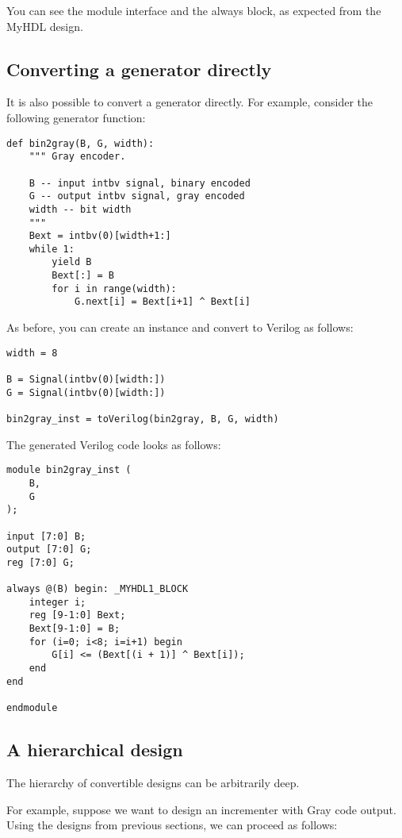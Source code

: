 You can see the module interface and the always block, as expected
from the MyHDL design. 

\subsection{Converting a generator directly\label{conv-usage-gen}}

It is also possible to convert a generator
directly. For example, consider the following generator function:

\begin{verbatim}
def bin2gray(B, G, width):
    """ Gray encoder.

    B -- input intbv signal, binary encoded
    G -- output intbv signal, gray encoded
    width -- bit width
    """
    Bext = intbv(0)[width+1:]
    while 1:
        yield B
        Bext[:] = B
        for i in range(width):
            G.next[i] = Bext[i+1] ^ Bext[i]
\end{verbatim}

As before, you can create an instance and convert to
Verilog as follows:

\begin{verbatim}
width = 8

B = Signal(intbv(0)[width:])
G = Signal(intbv(0)[width:])

bin2gray_inst = toVerilog(bin2gray, B, G, width)
 \end{verbatim}

The generated Verilog code looks as follows:

\begin{verbatim}
module bin2gray_inst (
    B,
    G
);

input [7:0] B;
output [7:0] G;
reg [7:0] G;

always @(B) begin: _MYHDL1_BLOCK
    integer i;
    reg [9-1:0] Bext;
    Bext[9-1:0] = B;
    for (i=0; i<8; i=i+1) begin
        G[i] <= (Bext[(i + 1)] ^ Bext[i]);
    end
end

endmodule
\end{verbatim}

\subsection{A hierarchical design\label{conv-usage-hier}}
The hierarchy of convertible designs can be
arbitrarily deep.

For example, suppose we want to design an
incrementer with Gray code output. Using the
designs from previous sections, we can proceed
as follows:

